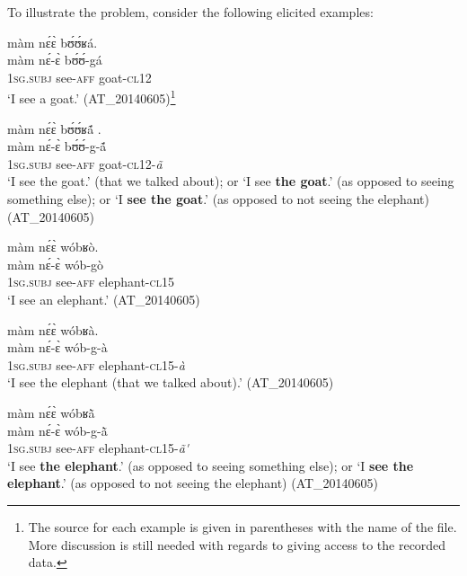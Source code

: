 \documentclass[output=paper]{langsci/langscibook}
\begin{document}
To illustrate the problem, consider the following elicited examples:

\ea\label{ex:teo:1}
\glll màm n\'ɛ\`ɛ b\'ʊ\'ʊʁá.{\rmfnm}\\
màm n\'ɛ-\`ɛ b\'ʊ\'ʊ-gá\\
1\textsc{sg.subj} see-\textsc{aff} goat-\textsc{cl}12  \\
\glt ‘I see a goat.’ (AT\_20140605)\footnote{The source for each example is given in parentheses with the name of the file. More discussion is still needed with regards to giving access to the recorded data.}

\z
{} 

\ea\label{ex:teo:2}
\glll màm n\'ɛ\`ɛ b\'ʊ\'ʊʁ\'{ã} .\\
màm n\'ɛ-\`ɛ b\'ʊ\'ʊ-g-\'{ã}\\
\textsc{1sg}.\textsc{subj} see-\textsc{aff} goat-\textsc{cl12}-\textit{ã}\\
\glt ‘I see the goat.’ (that we talked about); or ‘I see \textbf{the goat}.’ (as opposed to seeing something else); or ‘I \textbf{see the goat}.’ (as opposed to not seeing the elephant) (AT\_20140605)
\z

\ea\label{ex:teo:3} 
\glll màm n\'ɛ\`ɛ wóbʁò.\\
màm n{\'ɛ}-{\`ɛ} wób-gò\\
\textsc{1sg.subj} see-\textsc{aff} elephant-\textsc{cl15}\\
\glt  ‘I see an elephant.’ (AT\_20140605)
\z

\ea\label{ex:teo:4}
\glll  màm n\'ɛ\`ɛ wóbʁà.\\
màm n\'ɛ-\`ɛ wób-g-à\\
\textsc{1sg.subj} see-\textsc{aff} elephant-\textsc{cl15-}\textit{à} \\
\glt ‘I see the elephant (that we talked about).’ (AT\_20140605)
\z

\ea\label{ex:teo:5}
\glll  màm n\'ɛ\`ɛ wóbʁ\`{ã} \\
màm n\'ɛ-\`ɛ wób-g-\`{ã} \\
\textsc{1sg.subj} see-\textsc{aff} elephant-\textsc{cl15-}\textit{ã\'{}} \\
\glt ‘I see \textbf{the elephant}.’ (as opposed to seeing something else); or ‘I \textbf{see the elephant}.’ (as opposed to not seeing the elephant) (AT\_20140605)
\z
\end{document}
